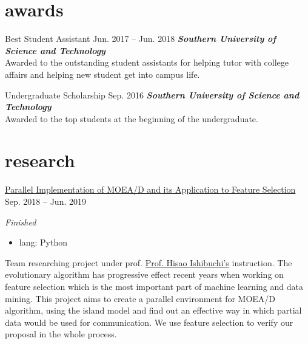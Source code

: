 \documentclass[hidelinks__VERSION__]{adamyi-cv}
\begin{document}
\section{awards}

\begin{entrylist}


\entry
{Best Student Assistant}
{Jun. 2017 -- Jun. 2018}
{\emph{\textbf{Southern University of Science and Technology}}\\
Awarded to the outstanding student assistants for helping tutor with college affairs and helping new student get into campus life.
}


\entry
{Undergraduate Scholarship}
{Sep. 2016}
{\emph{\textbf{Southern University of Science and Technology}}\\
Awarded to the top students at the beginning of the undergraduate.
}


\end{entrylist}


\section{research}

\begin{entrylist}


\entry
{\href{https://github.com/hackroid/pMOEA-D}{Parallel Implementation of MOEA/D and its Application to Feature Selection}}
{Sep. 2018 -- Jun. 2019}
{\emph{Finished}
\begin{itemize}
    \item lang: Python
\end{itemize}
Team researching project under prof. \href{http://cse.sustech.edu.cn/en/people/view/people_id/55/sort_id/9/pid/}{Prof. Hisao Ishibuchi's} instruction. The evolutionary algorithm has progressive effect recent years when working on feature selection which is the most important part of machine learning and data mining. This project aims to create a parallel environment for MOEA/D algorithm, using the island model and find out an effective way in which partial data would be used for communication. We use feature selection to verify our proposal in the whole process.
}


\end{entrylist}
\end{document}
